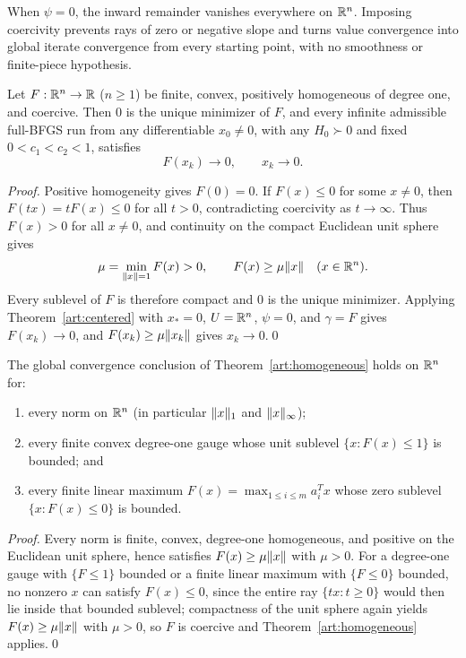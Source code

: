 When $\psi=0$, the inward remainder vanishes everywhere on $\mathbb R^n$. Imposing
coercivity prevents rays of zero or negative slope and turns value convergence
into global iterate convergence from every starting point, with no smoothness or
finite-piece hypothesis.

\begin{theorem}\label{art:homogeneous}
Let $F:\mathbb R^n\to\mathbb R$ ($n\ge1$) be finite, convex, positively homogeneous of degree
one, and coercive. Then $0$ is the unique minimizer of $F$, and every infinite
admissible full-BFGS run from any differentiable $x_0\ne0$, with any
$H_0\succ0$ and fixed $0<c_1<c_2<1$, satisfies
\[
 F(x_k)\longrightarrow0,\qquad x_k\longrightarrow0.
\]
\end{theorem}
\begin{proof}
Positive homogeneity gives $F(0)=0$. If $F(x)\le0$ for some $x\ne0$, then
$F(tx)=tF(x)\le0$ for all $t>0$, contradicting coercivity as $t\to\infty$. Thus
$F(x)>0$ for all $x\ne0$, and continuity on the compact Euclidean unit sphere
gives
\[
 \mu=\min_{\lVert x\rVert=1}F(x)>0,\qquad F(x)\ge\mu\lVert x\rVert\quad(x\in\mathbb R^n).
\]
Every sublevel of $F$ is therefore compact and $0$ is the unique minimizer.
Applying Theorem~\ref{art:centered} with $x_*=0$, $U=\mathbb R^n$, $\psi=0$, and
$\gamma=F$ gives $F(x_k)\to0$, and $F(x_k)\ge\mu\lVert x_k\rVert$ gives $x_k\to0$.\qed
\end{proof}

\begin{corollary}\label{art:homogeneous-examples}
The global convergence conclusion of Theorem~\ref{art:homogeneous} holds on
$\mathbb R^n$ for:
\begin{enumerate}
\item every norm on $\mathbb R^n$ (in particular $\lVert x\rVert_1$ and $\lVert x\rVert_\infty$);
\item every finite convex degree-one gauge whose unit sublevel $\{x:F(x)\le1\}$
is bounded; and
\item every finite linear maximum $F(x)=\max_{1\le i\le m}a_i^Tx$ whose zero
sublevel $\{x:F(x)\le0\}$ is bounded.
\end{enumerate}
\end{corollary}
\begin{proof}
Every norm is finite, convex, degree-one homogeneous, and positive on the
Euclidean unit sphere, hence satisfies $F(x)\ge\mu\lVert x\rVert$ with $\mu>0$. For a
degree-one gauge with $\{F\le1\}$ bounded or a finite linear maximum with
$\{F\le0\}$ bounded, no nonzero $x$ can satisfy $F(x)\le0$, since the entire ray
$\{tx:t\ge0\}$ would then lie inside that bounded sublevel; compactness of the
unit sphere again yields $F(x)\ge\mu\lVert x\rVert$ with $\mu>0$, so $F$ is coercive
and Theorem~\ref{art:homogeneous} applies.\qed
\end{proof}

